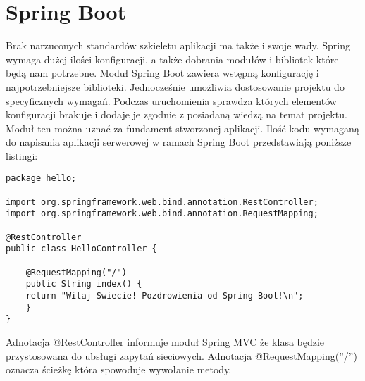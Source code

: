 \documentclass[a4paper,12pt,twoside,openany]{report}
\begin{document}
\section{Spring Boot}
Brak narzuconych standardów szkieletu aplikacji ma także i swoje wady. Spring wymaga dużej ilości konfiguracji, a także dobrania modułów i bibliotek które będą nam potrzebne. Moduł Spring Boot zawiera wstępną konfigurację i najpotrzebniejsze biblioteki. Jednocześnie umożliwia dostosowanie projektu do specyficznych wymagań. Podczas uruchomienia sprawdza których elementów konfiguracji brakuje i dodaje je zgodnie z posiadaną wiedzą na temat projektu. Moduł ten można uznać za fundament stworzonej aplikacji. Ilość kodu wymaganą do napisania aplikacji serwerowej w ramach Spring Boot przedstawiają poniższe listingi:

\begin{lstlisting}[label={MVCController}]
package hello;

import org.springframework.web.bind.annotation.RestController;
import org.springframework.web.bind.annotation.RequestMapping;

@RestController
public class HelloController {

	@RequestMapping("/")
	public String index() {
	return "Witaj Swiecie! Pozdrowienia od Spring Boot!\n";
	}
}
\end{lstlisting}
Adnotacja @RestController informuje moduł Spring MVC że klasa będzie przystosowana do ubsługi zapytań sieciowych. Adnotacja @RequestMapping(''/'') oznacza ścieżkę która spowoduje wywołanie metody.
\end{document}
